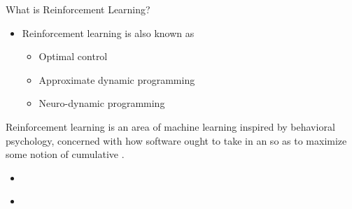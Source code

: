 \documentclass[11pt,table]{beamer}
\begin{document}
\begin{frame}{What is Reinforcement Learning?}
\begin{itemize}
    \item  Reinforcement learning is also known as
\begin{itemize}
    \item  Optimal control
\item  Approximate dynamic programming
\item  Neuro-dynamic programming
 
\end{itemize} 
\end{itemize}
\begin{definition}
Reinforcement learning is an area of machine learning inspired by behavioral psychology, concerned with how software 
\textbf{} ought to take 
\textbf{} in an 
\textbf{} so as to maximize some notion of cumulative 
\textbf{}.
\end{definition}
\begin{itemize}
\item  \citet[][chapter 1]{sutton2018reinforcement}
\item  \citet[][chapter 1]{szepesvari2022algorithms}
\end{itemize}
    
\end{frame}
\end{document}
